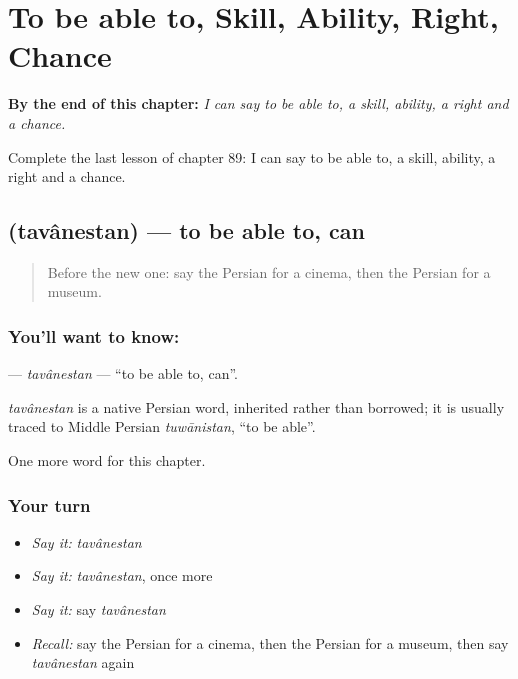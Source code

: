 
\chapter{To be able to, Skill, Ability, Right, Chance}
\label{ch:fa-to-be-able-to-skill-ability-right-chance}

\begin{chapteropening}
\textbf{By the end of this chapter:} \emph{I can say to be able to, a skill, ability, a right and a chance.}

Complete the last lesson of chapter 89: I can say to be able to, a skill, ability, a right and a chance.
\end{chapteropening}

\section[\texorpdfstring{\fa{توانستن} (tavânestan)}{توانستن (tavânestan)}]{ (tavânestan) — to be able to, can}

\label{lesson:FA-C89-tavanestan}



\begin{quote}
Before the new one: say the Persian for a cinema, then the Persian for a museum.
\end{quote}

\subsection*{You'll want to know: }
\textbf{} — \emph{tavânestan} — \textquotedblleft{}to be able to, can\textquotedblright{}.

\begin{cousinweb}
\emph{tavânestan} is a native Persian word, inherited rather than borrowed; it is usually traced to Middle Persian \emph{tuwānistan}, \textquotedblleft{}to be able\textquotedblright{}.
\end{cousinweb}

\begin{grammarlens}[title={What you've built}]
One more word for this chapter.
\end{grammarlens}

\subsection*{Your turn}
\begin{itemize}
\raggedright
  \item \emph{Say it:} \emph{tavânestan}
  \item \emph{Say it:} \emph{tavânestan}, once more
  \item \emph{Say it:} say \emph{tavânestan}
  \item \emph{Recall:} say the Persian for a cinema, then the Persian for a museum, then say \emph{tavânestan} again
\end{itemize}

